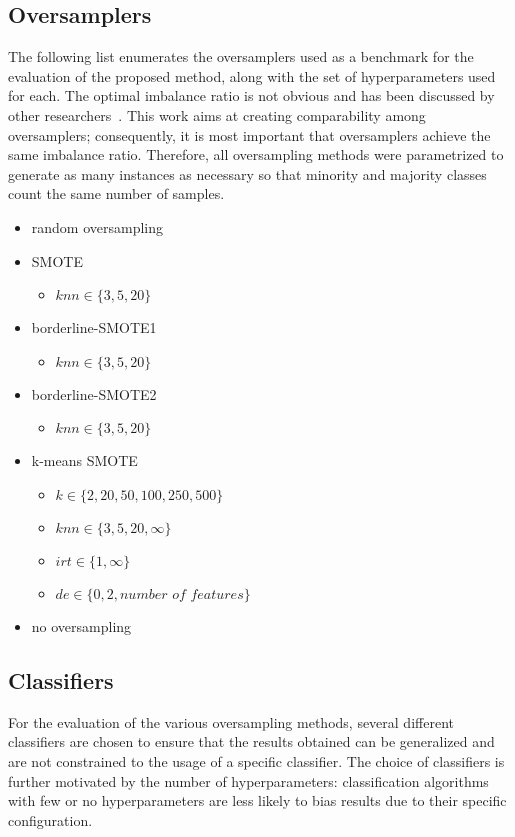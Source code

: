 \documentclass[sort&compress]{elsarticle}
\begin{document}
	\subsection{Oversamplers}
	The following list enumerates the oversamplers used as a benchmark for the
	evaluation of the proposed method, along with the set of hyperparameters
	used for each. The optimal imbalance ratio is not obvious and has been
	discussed by other
	researchers~\citep{Provost.2000,Estabrooks.2004,Chawla.2008}. This work aims
	at creating comparability among oversamplers; consequently, it is most
	important that oversamplers achieve the same imbalance ratio. Therefore, all
	oversampling methods were parametrized to generate as many instances as
	necessary so that minority and majority classes count the same number of
	samples.
	\begin{itemize}
		\item random oversampling
		\item SMOTE
		\begin{itemize}
			\item $knn \in \{3, 5, 20\}$
		\end{itemize}
		\item borderline-SMOTE1
		\begin{itemize}
			\item $knn \in \{3, 5, 20\}$
		\end{itemize}
		\item borderline-SMOTE2
		\begin{itemize}
			\item $knn \in \{3, 5, 20\}$
		\end{itemize}
		\item k-means SMOTE
		\begin{itemize}
			\item $k \in \{2, 20, 50, 100, 250, 500\}$
			\item $knn \in \{3, 5, 20, \infty\}$
			\item $irt \in \{1, \infty\}$
			\item $de \in \{0, 2, \textit{number of features}\}$
		\end{itemize}
		\item no oversampling
	\end{itemize}

	\subsection{Classifiers}
	For the evaluation of the various oversampling methods, several different
	classifiers are chosen to ensure that the results obtained can be
	generalized and are not constrained to the usage of a specific classifier.
	The choice of classifiers is further motivated by the number of
	hyperparameters: classification algorithms with few or no hyperparameters
	are less likely to bias results due to their specific configuration.
\end{document}
